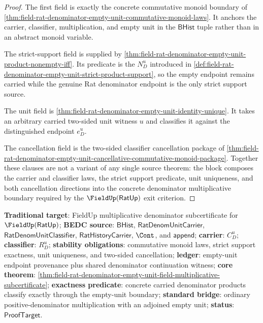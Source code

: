 \begin{proof}
The first field is exactly the concrete commutative monoid boundary of
\autoref{thm:field-rat-denominator-empty-unit-commutative-monoid-laws}. It
anchors the carrier, classifier, multiplication, and empty unit in the
$\mathsf{BHist}$ tuple rather than in an abstract monoid variable.

The strict-support field is supplied by
\autoref{thm:field-rat-denominator-empty-unit-product-nonempty-iff}. Its
predicate is the $N_D^u$ introduced in
\autoref{def:field-rat-denominator-empty-unit-strict-product-support}, so the
empty endpoint remains carried while the genuine Rat denominator endpoint is the
only strict support source.

The unit field is
\autoref{thm:field-rat-denominator-empty-unit-identity-unique}. It takes an
arbitrary carried two-sided unit witness $u$ and classifies it against the
distinguished endpoint $e_D^u$.

The cancellation field is the two-sided classifier cancellation package of
\autoref{thm:field-rat-denominator-empty-unit-cancellative-commutative-monoid-package}.
Together these clauses are not a variant of any single source theorem: the block
composes the carrier and classifier laws, the strict support predicate, unit
uniqueness, and both cancellation directions into the concrete denominator
multiplicative boundary required by the $\FieldUp(\mathsf{RatUp})$ exit
criterion.
\end{proof}

\textbf{Traditional target}: FieldUp multiplicative denominator subcertificate
for $\FieldUp(\mathsf{RatUp})$; \textbf{BEDC source}: $\mathsf{BHist}$,
$\mathsf{RatDenomUnitCarrier}$, $\mathsf{RatDenomUnitClassifier}$,
$\mathsf{RatHistoryCarrier}$, $\Cont$, and $\mathsf{append}$; \textbf{carrier}:
$C_D^u$; \textbf{classifier}: $R_D^u$; \textbf{stability obligations}:
commutative monoid laws, strict support exactness, unit uniqueness, and two-sided
cancellation; \textbf{ledger}: empty-unit endpoint provenance plus shared
denominator continuation witness; \textbf{core theorem}:
\autoref{thm:field-rat-denominator-empty-unit-field-multiplicative-subcertificate};
\textbf{exactness predicate}: concrete carried denominator products classify
exactly through the empty-unit boundary; \textbf{standard bridge}: ordinary
positive-denominator multiplication with an adjoined empty unit; \textbf{status}:
$\mathsf{ProofTarget}$.

